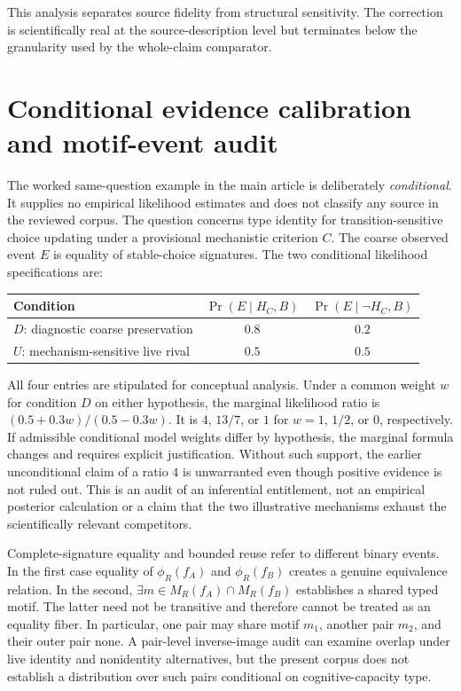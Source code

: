 \documentclass[11pt]{article}
\begin{document}
This analysis separates source fidelity from structural sensitivity. The correction is scientifically real at the source-description level but terminates below the granularity used by the whole-claim comparator.


\section{Conditional evidence calibration and motif-event audit}

The worked same-question example in the main article is deliberately \emph{conditional}. It supplies no empirical likelihood estimates and does not classify any source in the reviewed corpus. The question concerns type identity for transition-sensitive choice updating under a provisional mechanistic criterion \(C\). The coarse observed event \(E\) is equality of stable-choice signatures. The two conditional likelihood specifications are:
\begin{center}
\begin{tabular}{lcc}
\toprule
Condition & \(\Pr(E\mid H_C,B)\) & \(\Pr(E\mid\neg H_C,B)\)\\
\midrule
\(D\): diagnostic coarse preservation & \(0.8\) & \(0.2\)\\
\(U\): mechanism-sensitive live rival & \(0.5\) & \(0.5\)\\
\bottomrule
\end{tabular}
\end{center}
All four entries are stipulated for conceptual analysis. Under a common weight \(w\) for condition \(D\) on either hypothesis, the marginal likelihood ratio is \((0.5+0.3w)/(0.5-0.3w)\). It is \(4\), \(13/7\), or \(1\) for \(w=1\), \(1/2\), or \(0\), respectively. If admissible conditional model weights differ by hypothesis, the marginal formula changes and requires explicit justification. Without such support, the earlier unconditional claim of a ratio \(4\) is unwarranted even though positive evidence is not ruled out. This is an audit of an inferential entitlement, not an empirical posterior calculation or a claim that the two illustrative mechanisms exhaust the scientifically relevant competitors.

Complete-signature equality and bounded reuse refer to different binary events. In the first case equality of \(\phi_R(f_A)\) and \(\phi_R(f_B)\) creates a genuine equivalence relation. In the second, \(\exists m\in M_R(f_A)\cap M_R(f_B)\) establishes a shared typed motif. The latter need not be transitive and therefore cannot be treated as an equality fiber. In particular, one pair may share motif \(m_1\), another pair \(m_2\), and their outer pair none. A pair-level inverse-image audit can examine overlap under live identity and nonidentity alternatives, but the present corpus does not establish a distribution over such pairs conditional on cognitive-capacity type.
\end{document}
